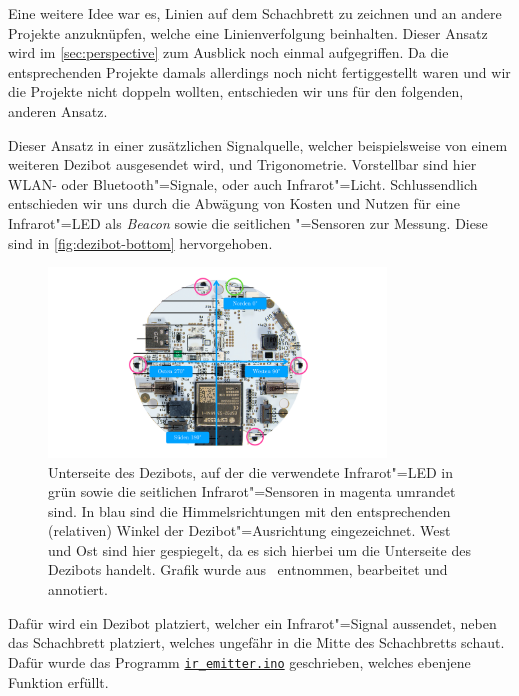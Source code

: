 Eine weitere Idee war es, Linien auf dem Schachbrett zu zeichnen und an andere Projekte anzuknüpfen, welche eine Linienverfolgung beinhalten. Dieser Ansatz wird im \autoref{sec:perspective} zum Ausblick noch einmal aufgegriffen. Da die entsprechenden Projekte damals allerdings noch nicht fertiggestellt waren und wir die Projekte nicht doppeln wollten, entschieden wir uns für den folgenden, anderen Ansatz.

Dieser Ansatz in einer zusätzlichen Signalquelle, welcher beispielsweise von einem weiteren Dezibot ausgesendet wird, und Trigonometrie. Vorstellbar sind hier WLAN- oder Bluetooth"=Signale, oder auch Infrarot"=Licht. Schlussendlich entschieden wir uns durch die Abwägung von Kosten und Nutzen für eine Infrarot"=LED als \emph{Beacon} sowie die seitlichen "=Sensoren zur Messung. Diese sind in \autoref{fig:dezibot-bottom} hervorgehoben.

\begin{figure}[h]
    \centering
    \includegraphics[width=0.8\textwidth]{../assets/dezibot_bottom.pdf}
    \caption{Unterseite des Dezibots, auf der die verwendete Infrarot"=LED in grün sowie die seitlichen Infrarot"=Sensoren in magenta umrandet sind. In blau sind die Himmelsrichtungen mit den entsprechenden (relativen) Winkel der Dezibot"=Ausrichtung eingezeichnet. West und Ost sind hier gespiegelt, da es sich hierbei um die Unterseite des Dezibots handelt. Grafik wurde aus~\cite{fingerleDokumentationDezibot42025} entnommen, bearbeitet und annotiert.}
    \label{fig:dezibot-bottom}
\end{figure}

Dafür wird ein Dezibot platziert, welcher ein Infrarot"=Signal aussendet, neben das Schachbrett platziert, welches ungefähr in die Mitte des Schachbretts schaut. Dafür wurde das Programm \href{https://github.com/nicosrm/24-emb-chess/blob/feature/31-rotation-infrared/example/EmbeddedChessPieces/examples/ir_sensors/ir_emitter/ir_emitter.ino}{\texttt{ir\_emitter.ino}} geschrieben, welches ebenjene Funktion erfüllt.

